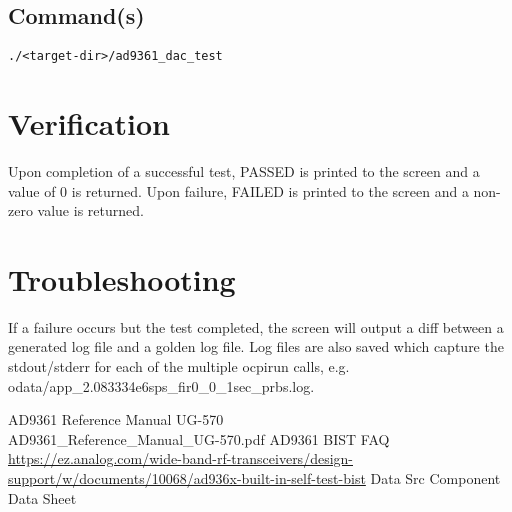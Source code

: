 \subsection{Command(s)}
\begin{lstlisting}
./<target-dir>/ad9361_dac_test
\end{lstlisting}

\section{Verification}
Upon completion of a successful test, PASSED is printed to the screen and a value of 0 is returned. Upon failure, FAILED is printed to the screen and a non-zero value is returned.

\section{Troubleshooting}
If a failure occurs but the test completed, the screen will output a diff between a generated log file and a golden log file. Log files are also saved which capture the stdout/stderr for each of the multiple ocpirun calls, e.g. odata/app\_2.083334e6sps\_fir0\_0\_1sec\_prbs.log.

\begin{thebibliography}{1}

 AD9361 Reference Manual UG-570\\
AD9361\_Reference\_Manual\_UG-570.pdf
 AD9361 BIST FAQ \\
\url{https://ez.analog.com/wide-band-rf-transceivers/design-support/w/documents/10068/ad936x-built-in-self-test-bist}
 Data Src Component Data Sheet \\

\end{thebibliography}


